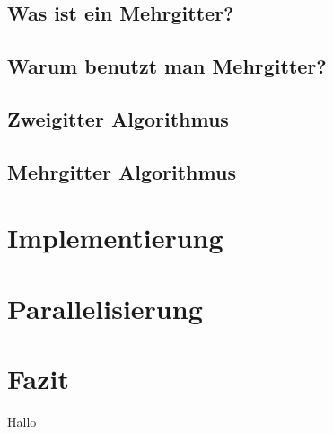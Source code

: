 \documentclass[a4paper, 11pt]{article}
\begin{document}
        \subsection{Was ist ein Mehrgitter?}
        \subsection{Warum benutzt man Mehrgitter?}
        \subsection{Zweigitter Algorithmus}
        \subsection{Mehrgitter Algorithmus}
    \section{Implementierung}
    \section{Parallelisierung}
    \section{Fazit}


    Hallo
\end{document}
